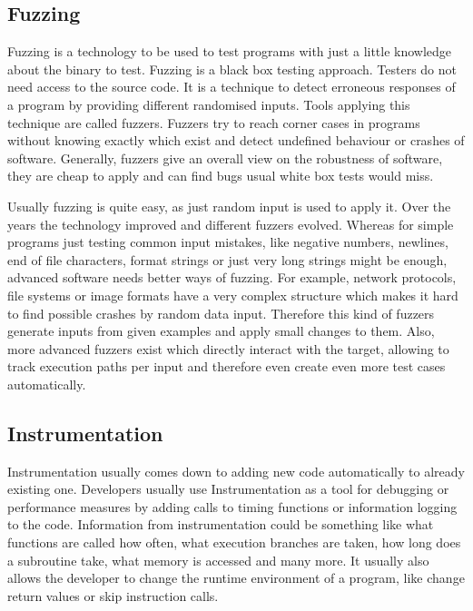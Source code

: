 \subsection{Fuzzing}

Fuzzing is a technology to be used to test programs with just a little knowledge
about the binary to test. Fuzzing is a black box testing approach. Testers do
not need access to the source code. It is a technique to detect erroneous
responses of a program by providing different randomised inputs. Tools applying
this technique are called fuzzers. Fuzzers try to reach corner cases in programs
without knowing exactly which exist and detect undefined behaviour or crashes of
software. Generally, fuzzers give an overall view on the robustness of software,
they are cheap to apply and can find bugs usual white box tests would miss.

Usually fuzzing is quite easy, as just random input is used to apply it. Over
the years the technology improved and different fuzzers evolved. Whereas for
simple programs just testing common input mistakes, like negative numbers,
newlines, end of file characters, format strings or just very long strings might
be enough, advanced software needs better ways of fuzzing. For example, network
protocols, file systems or image formats have a very complex structure which
makes it hard to find possible crashes by random data input. Therefore this kind
of fuzzers generate inputs from given examples and apply small changes to them.
Also, more advanced fuzzers exist which directly interact with the target,
allowing to track execution paths per input and therefore even create even more
test cases automatically.


\subsection{Instrumentation}

Instrumentation usually comes down to adding new code automatically to already
existing one. Developers usually use Instrumentation as a tool for debugging or
performance measures by adding calls to timing functions or information logging
to the code. Information from instrumentation could be something like what
functions are called how often, what execution branches are taken, how long does
a subroutine take, what memory is accessed and many more. It usually also allows
the developer to change the runtime environment of a program, like change return
values or skip instruction calls.

